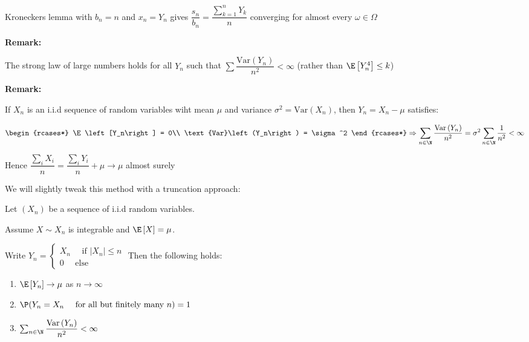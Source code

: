\noindent Kroneckers lemma with $b_n = n$ and $x_n = Y_n$ gives $\dfrac{s_n}{b_n} = \dfrac{\sum_{k=1}^{n}Y_k}{n}$ converging for almost every $\omega\in\Omega$
\par\bigskip
\noindent\textbf{Remark:}\par
\noindent The strong law of large numbers holds for all $Y_n$ such that $\sum \dfrac{\text{Var}\left(Y_n\right)}{n^2}<\infty$ (rather than $\E\left[Y_n^4\right]\leq k$)
\par\bigskip
\noindent\textbf{Remark:}\par
\noindent If $X_n$ is an i.i.d sequence of random variables wiht mean $\mu$ and variance $\sigma^2 = \text{Var}\left(X_n\right)$, then $Y_n = X_n-\mu$ satisfies:\par
\begin{equation*}
  \begin{gathered}
    \begin{rcases*}
      \E\left[Y_n\right] = 0\\
      \text{Var}\left(Y_n\right) = \sigma^2
    \end{rcases*}\Rightarrow \sum_{n\in\N}\dfrac{\text{Var}\left(Y_n\right)}{n^2} = \sigma^2\sum_{n\in\N}\dfrac{1}{n^2}<\infty
  \end{gathered}
\end{equation*}
\par\bigskip
\noindent Hence $\dfrac{\sum_i X_i}{n} = \dfrac{\sum_i Y_i}{n}+\mu\to\mu$ almost surely
\par\bigskip
\noindent We will slightly tweak this method with a truncation approach:
\par\bigskip
\begin{lem}{}
  Let $(X_n)$ be a sequence of i.i.d random variables.\par
  \noindent Assume $X\sim X_n$ is integrable and $\E\left[X\right] = \mu$.\par
  \noindent Write $Y_n = \begin{cases}
    X_n\quad\text{ if } \left|X_n\right|\leq n\\
    0\quad\text{ else}
  \end{cases}$ Then the following holds:\par
  \begin{enumerate}[leftmargin=*]
    \item $\E\left[Y_n\right]\to\mu$ as $n\to\infty$
    \item $\P(Y_n = X_n\quad\text{ for all but finitely many } n) = 1$
    \item $\sum_{n\in\N}\dfrac{\text{Var}\left(Y_n\right)}{n^2}<\infty$
  \end{enumerate}
\end{lem}
